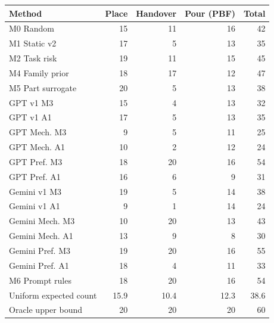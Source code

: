 \begin{tabular}{lrrrr}
\toprule
Method & Place & Handover & Pour (PBF) & Total \\
\midrule
M0 Random & 15 & 11 & 16 & 42 \\
M1 Static v2 & 17 & 5 & 13 & 35 \\
M2 Task risk & 19 & 11 & 15 & 45 \\
M4 Family prior & 18 & 17 & 12 & 47 \\
M5 Part surrogate & 20 & 5 & 13 & 38 \\
\midrule
GPT v1 M3 & 15 & 4 & 13 & 32 \\
GPT v1 A1 & 17 & 5 & 13 & 35 \\
GPT Mech. M3 & 9 & 5 & 11 & 25 \\
GPT Mech. A1 & 10 & 2 & 12 & 24 \\
GPT Pref. M3 & 18 & 20 & 16 & 54 \\
GPT Pref. A1 & 16 & 6 & 9 & 31 \\
\midrule
Gemini v1 M3 & 19 & 5 & 14 & 38 \\
Gemini v1 A1 & 9 & 1 & 14 & 24 \\
Gemini Mech. M3 & 10 & 20 & 13 & 43 \\
Gemini Mech. A1 & 13 & 9 & 8 & 30 \\
Gemini Pref. M3 & 19 & 20 & 16 & 55 \\
Gemini Pref. A1 & 18 & 4 & 11 & 33 \\
\midrule
M6 Prompt rules & 18 & 20 & 16 & 54 \\
Uniform expected count & 15.9 & 10.4 & 12.3 & 38.6 \\
Oracle upper bound & 20 & 20 & 20 & 60 \\
\bottomrule
\end{tabular}
